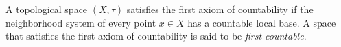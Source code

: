 \documentclass[12pt]{article}
\begin{document}
A topological space $(X,\tau)$ satisfies the first axiom of countability
if the neighborhood system of every point $x\in X$ has a countable local base. A space that satisfies the first axiom of countability is said to be \emph{first-countable}.
\end{document}
